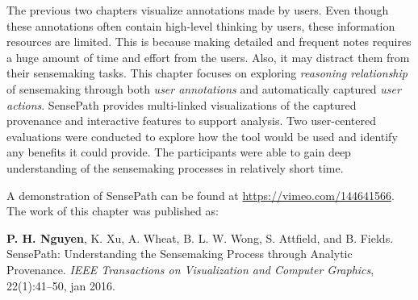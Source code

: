 The previous two chapters visualize annotations made by users. Even though these annotations often contain high-level thinking by users, these information resources are limited. This is because making detailed and frequent notes requires a huge amount of time and effort from the users. Also, it may distract them from their sensemaking tasks. This chapter focuses on exploring \emph{reasoning relationship} of sensemaking through both \emph{user annotations} and automatically captured \emph{user actions}. SensePath provides multi-linked visualizations of the captured provenance and interactive features to support analysis. Two user-centered evaluations were conducted to explore how the tool would be used and identify any benefits it could provide. The participants were able to gain deep understanding of the sensemaking processes in relatively short time.

A demonstration of SensePath can be found at \url{https://vimeo.com/144641566}. The work of this chapter was published as:

\textbf{P. H. Nguyen}, K. Xu, A. Wheat, B. L. W. Wong, S. Attfield, and B. Fields. SensePath: Understanding the Sensemaking Process through Analytic Provenance. \textit{IEEE Transactions on Visualization and Computer Graphics}, 22(1):41--50, jan 2016.






